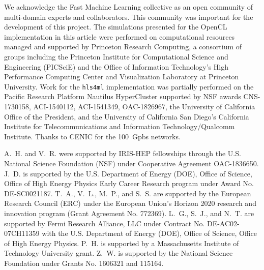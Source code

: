 \documentclass{article}
\begin{document}

\begin{ack}

We acknowledge the Fast Machine Learning collective as an open community of multi-domain experts and collaborators. 
This community was important for the development of this project. 
The simulations presented for the OpenCL implementation in this article were performed on computational resources managed and supported by Princeton Research Computing, a consortium of groups including the Princeton Institute for Computational Science and Engineering (PICSciE) and the Office of Information Technology's High Performance Computing Center and Visualization Laboratory at Princeton University.
Work for the \texttt{hls4ml} implementation was partially performed on the Pacific Research Platform Nautilus HyperCluster supported by NSF awards CNS-1730158, ACI-1540112, ACI-1541349, OAC-1826967, the University of California Office of the President, and the University of California San Diego's California Institute for Telecommunications and Information Technology/Qualcomm Institute. 
Thanks to CENIC for the 100~Gpbs networks.

A.~H. and V.~R. were supported by IRIS-HEP fellowships through the U.S. National Science Foundation (NSF) under Cooperative Agreement OAC-1836650.
J.~D. is supported by the U.S. Department of Energy (DOE), Office of Science, Office of High Energy Physics Early Career Research program under Award No. DE-SC0021187.
T.~A., V.~L., M.~P., and S.~S. are supported by the European Research Council (ERC) under the European Union's Horizon 2020 research and innovation program (Grant Agreement No. 772369).
L.~G., S.~J., and N.~T. are supported by Fermi Research Alliance, LLC under Contract No. DE-AC02-07CH11359 with the U.S. Department of Energy (DOE), Office of Science, Office of High Energy Physics.
P.~H. is supported by a Massachusetts Institute of Technology University grant. 
Z.~W. is supported by the National Science Foundation under Grants No. 1606321 and 115164.

\end{ack}



\end{document}
